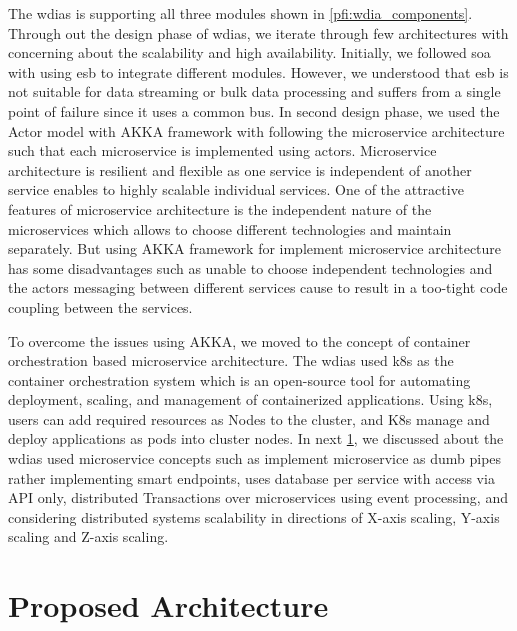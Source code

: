 \documentclass[conference]{IEEEtran}
\newcommand{\db}[1]{\textcolor{blue!40}{#1}}
\begin{document}
The \acrshort{wdias} is supporting all three modules shown in \cref{pfi:wdia_components}. Through out the design phase of \acrshort{wdias}, we iterate through few architectures with concerning about the scalability and high availability. Initially, we followed \acrfull{soa} with using \acrfull{esb} to integrate different modules. However, we understood that \acrshort{esb} is not suitable for data streaming or bulk data processing and suffers from a single point of failure since it uses a common bus.
In second design phase, we used the Actor model with AKKA framework with following the microservice architecture such that each microservice is implemented using actors. Microservice architecture is resilient and flexible as one service is independent of another service enables to highly scalable individual services. One of the attractive features of microservice architecture is the independent nature of the microservices which allows to choose different technologies and maintain separately. But using AKKA framework for implement microservice architecture has some disadvantages such as unable to choose independent technologies and the actors messaging between different services cause to result in a too-tight code coupling between the services.

To overcome the issues using AKKA, we moved to the concept of container orchestration based microservice architecture. The \acrshort{wdias} used \acrfull{k8s} as the container orchestration system which is an open-source tool for automating deployment, scaling, and management of containerized applications. Using \acrshort{k8s}, users can add required resources as Nodes to the cluster, and K8s manage and deploy applications as pods into cluster nodes.
In next \cref{pse:wdias_architecture}, we discussed about the \acrshort{wdias} used microservice concepts such as implement microservice as dumb pipes rather implementing smart endpoints, uses database per service with access via API only, distributed Transactions over microservices using event processing, and considering distributed systems scalability in directions of X-axis scaling, Y-axis scaling and Z-axis scaling.

\section{\db{Proposed Architecture}}
\label{pse:wdias_architecture}
\end{document}
